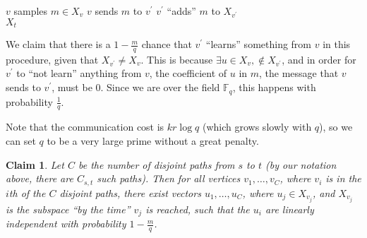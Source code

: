 \documentclass[11pt]{article}
\newcommand{\F}{\mathbb{F}}
\newtheorem{claim}[theorem]{Claim}
\begin{document}
\begin{algorithm}[H]
\begin{algorithmic}
    \State $v$ samples $m \in X_v$
    \State $v$ sends $m$ to $v^\prime$
    \State $v^\prime$ ``adds'' $m$ to $X_{v^\prime}$
  \EndFor \\
  \Return $X_t$
\EndFunction
\end{algorithmic}
\end{algorithm}

We claim that there is a $1 - \frac{m}{q}$ chance that $v^\prime$ ``learns'' something from $v$ in this procedure, given that $X_{v^\prime} \neq X_v$. This is because $\exists u\in X_v, \notin X_{v^\prime}$, and in order for $v^\prime$ to ``not learn'' anything from $v$, the coefficient of $u$ in $m$, the message that $v$ sends to $v^\prime$, must be 0. Since we are over the field $\F_q$, this happens with probability $\frac{1}{q}$.

Note that the communication cost is $kr\log q$ (which grows slowly with $q$), so we can set $q$ to be a very large prime without a great penalty.

\begin{claim}
Let $C$ be the number of disjoint paths from $s$ to $t$ (by our notation above, there are $C_{s,t}$ such paths). Then for all vertices $v_1, \ldots, v_C$, where $v_i$ is in the $i$th of the $C$ disjoint paths, there exist vectors $u_1, \ldots, u_C$, where $u_j \in X_{v_j}$, and $X_{v_j}$ is the subspace ``by the time'' $v_j$ is reached, such that the $u_i$ are linearly independent with probability $1 - \frac{m}{q}$.
\end{claim}
\end{document}
